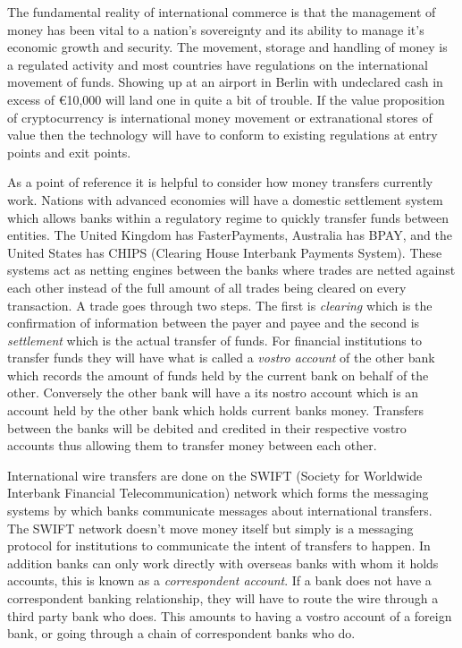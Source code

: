 The fundamental reality of international commerce is that the management
of money has been vital to a nation's sovereignty and its ability to
manage it's economic growth and security. The movement, storage and
handling of money is a regulated activity and most countries have
regulations on the international movement of funds. Showing up at an
airport in Berlin with undeclared cash in excess of €10,000 will land
one in quite a bit of trouble. If the value proposition of
cryptocurrency is international money movement or extranational stores
of value then the technology will have to conform to existing
regulations at entry points and exit points.

As a point of reference it is helpful to consider how money transfers currently
work. Nations with advanced economies will have a domestic settlement system
which allows banks within a regulatory regime to quickly transfer funds between
entities. The United Kingdom has FasterPayments, Australia has BPAY, and the
United States has CHIPS (Clearing House Interbank Payments System). These
systems act as netting engines between the banks where trades are netted against
each other instead of the full amount of all trades being cleared on every
transaction. A trade goes through two steps. The first is \textit{clearing}
which is the confirmation of information between the payer and payee and the
second is \textit{settlement} which is the actual transfer of funds. For
financial institutions to transfer funds they will have what is called a
\textit{vostro account} of the other bank which records the amount of funds held
by the current bank on behalf of the other. Conversely the other bank will have
a its nostro account which is an account held by the other bank which holds current
banks money. Transfers between the banks will be debited and credited in their
respective vostro accounts thus allowing them to transfer money between each
other.



International wire transfers are done on the SWIFT (Society for
Worldwide Interbank Financial Telecommunication) network which forms the messaging
systems by which banks communicate messages about international transfers. The
SWIFT network doesn't move money itself but simply is a messaging protocol for
institutions to communicate the intent of transfers to happen. In addition banks
can only work directly with overseas banks with whom it holds accounts, this is
known as a \textit{correspondent account}. If a bank does not have a
correspondent banking relationship, they will have to route the wire through a
third party bank who does. This amounts to having a vostro account of a foreign
bank, or going through a chain of correspondent banks who do.

